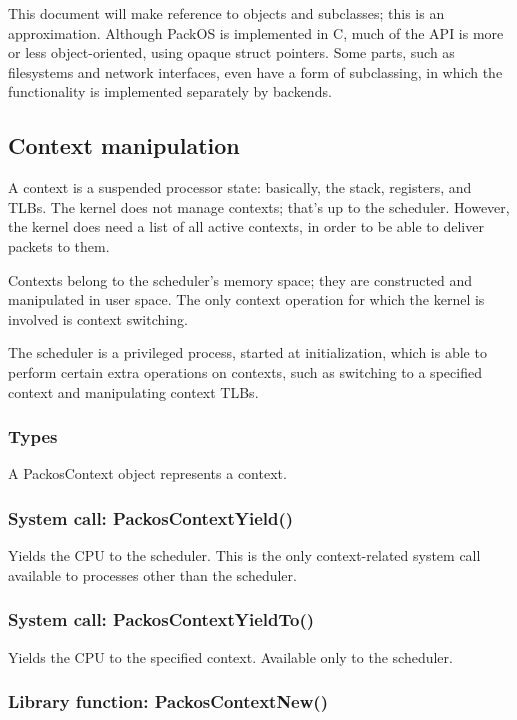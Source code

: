 \documentclass{article}
\begin{document}
This document will make reference to objects and subclasses; this is
an approximation.
Although PackOS is implemented in C, much of the API is more or less
object-oriented, using opaque struct pointers.  Some parts, such as
filesystems and network interfaces, even have a form of subclassing,
in which the functionality is implemented separately by backends.

\subsection{Context manipulation}

A context is a suspended processor state: basically, the stack,
registers, and TLBs.  The kernel does not manage contexts; that's up
to the scheduler.  However, the kernel does need a list of all active
contexts, in order to be able to deliver packets to them.

Contexts belong to the scheduler's memory space; they are constructed
and manipulated in user space.  The only context operation for which
the kernel is involved is context switching.

The scheduler is a privileged process, started at initialization,
which is able to perform certain extra operations on contexts, such as
switching to a specified context and manipulating context TLBs.

\subsubsection{Types}

A PackosContext object represents a context.

\subsubsection{System call: PackosContextYield()}

Yields the CPU to the scheduler.  This is the only context-related
system call available to processes other than the scheduler.

\subsubsection{System call: PackosContextYieldTo()}

Yields the CPU to the specified context.  Available only to the
scheduler.

\subsubsection{Library function: PackosContextNew()}
\end{document}
